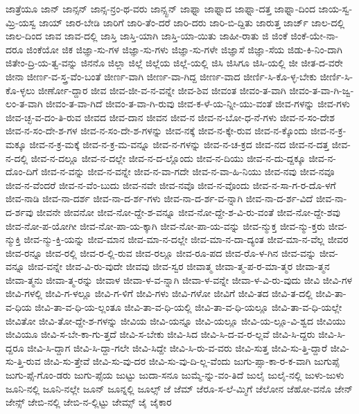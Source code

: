 {ಜಾತ್ರೆಯೂ
ಜಾನ್
ಜಾನ್ಸನ್
ಜಾನ್ಸ-ನ್ರಂ-ಥ-ವರು
ಜಾನ್ಸ್ಟನ್
ಜಾಫ್ನಾ
ಜಾಫ್ನಾದ
ಜಾಫ್ನಾ-ದತ್ತ
ಜಾಫ್ನಾ-ದಿಂದ
ಜಾಯ-ಸ್ವ-ಮ್ರಿ-ಯಸ್ವ
ಜಾಯ್
ಜಾರ-ಬೇಡಿ
ಜಾರಿಗೆ
ಜಾರಿ-ತೆಂ-ದರೆ
ಜಾರಿ-ದರು
ಜಾರಿ-ಬಿ-ದ್ದಿತು
ಜಾರುತ್ತ
ಜಾರ್ಜ್
ಜಾಲ-ದಲ್ಲಿ
ಜಾಲ-ದಿಂದ
ಜಾವ
ಜಾವ-ದಲ್ಲಿ
ಜಾಸ್ತಿ
ಜಾಸ್ತಿ-ಯಾಗಿ
ಜಾಸ್ತಿ-ಯಾ-ಯಿತು
ಜಾಹೀ-ರಾತು
ಜಿ
ಜಿಂಕೆ
ಜಿಂಕೆ-ಯೇ-ನಾ-ದರೂ
ಜಿಂಕೆಯೋ
ಜಿಕ
ಜಿಜ್ಞಾ-ಸು-ಗಳ
ಜಿಜ್ಞಾ-ಸು-ಗಳು
ಜಿಜ್ಞಾ-ಸು-ಗಳೇ
ಜಿಜ್ಞಾಸೆ
ಜಿಜ್ಞಾ-ಸೆಯ
ಜಿಡು-ಕಿ-ನಿಂ-ದಾಗಿ
ಜಿತೇಂ-ದ್ರಿ-ಯ-ತ್ವ-ವನ್ನು
ಜಿನನೊ
ಜಿಲ್ಲಾ
ಜಿಲ್ಲೆ
ಜಿಲ್ಲೆಯ
ಜಿಲ್ಲೆ-ಯಲ್ಲಿ
ಜಿಸಿ
ಜಿಸಿಗೂ
ಜಿಸಿ-ಯಲ್ಲಿ
ಜೀ
ಜೀತ-ದ-ವರೇ
ಜೀನಾ
ಜೀರ್ಣ-ವ-ಸ್ತ್ರ-ವೆಂ-ಬಂತೆ
ಜೀರ್ಣ-ವಾಗಿ
ಜೀರ್ಣ-ವಾ-ಗಿದ್ದ
ಜೀರ್ಣ-ವಾದ
ಜೀರ್ಣಿ-ಸಿ-ಕೊ-ಳ್ಳ-ಬೇಕು
ಜೀರ್ಣಿ-ಸಿ-ಕೊ-ಳ್ಳಲು
ಜೀರ್ಣೋ-ದ್ದಾರ
ಜೀವ
ಜೀವ-ಜೀ-ವ-ನ-ವನ್ನೇ
ಜೀವ-ಶಿವ
ಜೀವಂತ
ಜೀವಂ-ತ-ವಾಗಿ
ಜೀವಂ-ತ-ವಾ-ಗಿ-ಜ್ವ-ಲಂ-ತ-ವಾಗಿ
ಜೀವಂ-ತ-ವಾ-ಗಿದೆ
ಜೀವಂ-ತ-ವಾ-ಗಿ-ರುವು
ಜೀವ-ಕ-ಳೆ-ಯ-ನ್ನೀ-ಯು-ವಂತೆ
ಜೀವ-ಗಳನ್ನು
ಜೀವ-ಗಳು
ಜೀವ-ಚ್ಛ-ವ-ದಂ-ತಿ-ರುವ
ಜೀವದ
ಜೀವ-ದಾನ
ಜೀವನ
ಜೀವ-ನ
ಜೀವ-ನ-ಬೋ-ಧ-ನೆ-ಗಳು
ಜೀವ-ನ-ಸಂ-ದೇಶ
ಜೀವ-ನ-ಸಂ-ದೇ-ಶ-ಗಳ
ಜೀವ-ನ-ಸಂ-ದೇ-ಶ-ಗಳನ್ನು
ಜೀವ-ನಕ್ಕೆ
ಜೀವ-ನ-ಕ್ಕೇ-ರುವ
ಜೀವ-ನ-ಕ್ಕೊಂದು
ಜೀವ-ನ-ಕ್ರ-ಮಕ್ಕೂ
ಜೀವ-ನ-ಕ್ರ-ಮಕ್ಕೆ
ಜೀವ-ನ-ಕ್ರ-ಮ-ವನ್ನೂ
ಜೀವ-ನ-ಗಳನ್ನು
ಜೀವ-ನ-ಚ-ಕ್ರದ
ಜೀವ-ನದ
ಜೀವ-ನ-ದತ್ತ
ಜೀವ-ನ-ದಲ್ಲಿ
ಜೀವ-ನ-ದಲ್ಲೂ
ಜೀವ-ನ-ದಲ್ಲೇ
ಜೀವ-ನ-ದ-ಲ್ಲೊಂದು
ಜೀವ-ನ-ದಿಯು
ಜೀವ-ನ-ದು-ದ್ದಕ್ಕೂ
ಜೀವ-ನ-ದೊಂ-ದಿಗೆ
ಜೀವ-ನ-ವನ್ನು
ಜೀವ-ನ-ವನ್ನೇ
ಜೀವ-ನ-ವಾ-ಗದೇ
ಜೀವ-ನ-ವಾ-ಹಿ-ನಿಯು
ಜೀವ-ನವು
ಜೀವ-ನವೂ
ಜೀವ-ನ-ವೆಂದರೆ
ಜೀವ-ನ-ವೆಂ-ಬುದು
ಜೀವ-ನವೇ
ಜೀವ-ನವೊ
ಜೀವ-ನ-ವೊಂದು
ಜೀವ-ನ-ಸಾ-ಗ-ರ-ದೊ-ಳಗೆ
ಜೀವ-ನಾಡಿ
ಜೀವ-ನಾ-ದರ್ಶ
ಜೀವ-ನಾ-ದ-ರ್ಶ-ಗಳು
ಜೀವ-ನಾ-ದ-ರ್ಶ-ವ-ನ್ನಾಗಿ
ಜೀವ-ನಾ-ದ-ರ್ಶ-ವಿದೆ
ಜೀವ-ನಾ-ದ-ರ್ಶವು
ಜೀವನೇ
ಜೀವನೋ
ಜೀವ-ನೋ-ದ್ದೇ-ಶ-ವನ್ನೂ
ಜೀವ-ನೋ-ದ್ದೇ-ಶ-ವಿ-ರು-ವಂತೆ
ಜೀವ-ನೋ-ದ್ದೇ-ಶವು
ಜೀವ-ನೋ-ಪ-ಯೋಗೀ
ಜೀವ-ನೋ-ಪಾ-ಯ-ಕ್ಕಾಗಿ
ಜೀವ-ನೋ-ಪಾ-ಯ-ವನ್ನು
ಜೀವ-ನ್ಮುಕ್ತ
ಜೀವ-ನ್ಮು-ಕ್ತರು
ಜೀವ-ನ್ಮುಕ್ತಿ
ಜೀವ-ನ್ಮು-ಕ್ತಿ-ಯನ್ನು
ಜೀವ-ಮಾನ
ಜೀವ-ಮಾ-ನ-ದಲ್ಲೇ
ಜೀವ-ಮಾ-ನ-ದಾ-ದ್ಯಂತ
ಜೀವ-ಮಾ-ನ-ವೆಲ್ಲ
ಜೀವರ
ಜೀವ-ರನ್ನೂ
ಜೀವ-ರಲ್ಲಿ
ಜೀವ-ರ-ಲ್ಲಿ-ರುವ
ಜೀವ-ರಲ್ಲೂ
ಜೀವ-ರೂ-ಪದ
ಜೀವ-ರೊ-ಳ-ಗಿನ
ಜೀವ-ವನ್ನು
ಜೀವ-ವನ್ನೂ
ಜೀವ-ವನ್ನೇ
ಜೀವ-ವಿ-ರು-ವುದೇ
ಜೀವವು
ಜೀವ-ಸ್ವರ
ಜೀವಾತ್ಮ
ಜೀವಾ-ತ್ಮ-ಪ-ರ-ಮಾ-ತ್ಮರ
ಜೀವಾ-ತ್ಮನ
ಜೀವಾ-ತ್ಮನು
ಜೀವಾ-ತ್ಮ-ರನ್ನು
ಜೀವಾಳ
ಜೀವಾ-ಳ-ವ-ನ್ನಾಗಿ
ಜೀವಾ-ಳ-ವನ್ನೇ
ಜೀವಾ-ಳ-ವಿ-ರು-ವುದು
ಜೀವಿ
ಜೀವಿ-ಗಳ
ಜೀವಿ-ಗಳಲ್ಲಿ
ಜೀವಿ-ಗ-ಳಲ್ಲೂ
ಜೀವಿ-ಗ-ಳಿಗೆ
ಜೀವಿ-ಗಳು
ಜೀವಿ-ಗಳೋ
ಜೀವಿಗೆ
ಜೀವಿ-ತದ
ಜೀವಿ-ತ-ದಲ್ಲಿ
ಜೀವಿ-ತಾ-ವ-ಧಿಯ
ಜೀವಿ-ತಾ-ವ-ಧಿ-ಯ-ಲ್ಲಂತೂ
ಜೀವಿ-ತಾ-ವ-ಧಿ-ಯಲ್ಲಿ
ಜೀವಿ-ತಾ-ವ-ಧಿ-ಯಲ್ಲೂ
ಜೀವಿ-ತಾ-ವ-ಧಿ-ಯಲ್ಲೇ
ಜೀವಿತೋ
ಜೀವಿ-ತೋ-ದ್ದೇ-ಶ-ಗಳನ್ನು
ಜೀವಿಯ
ಜೀವಿ-ಯನ್ನೂ
ಜೀವಿ-ಯಲ್ಲೂ
ಜೀವಿ-ಯ-ಲ್ಲೂ-ವಿ-ಶ್ವದ
ಜೀವಿಯು
ಜೀವಿಯೂ
ಜೀವಿ-ಸ-ಬೇ-ಕಾ-ಗು-ತ್ತದೆ
ಜೀವಿ-ಸ-ಬೇಕು
ಜೀವಿ-ಸಿದ
ಜೀವಿ-ಸಿ-ದ-ವ-ರ-ಲ್ಲವೆ
ಜೀವಿ-ಸಿ-ದ್ದರು
ಜೀವಿ-ಸಿ-ದ್ದರೂ
ಜೀವಿ-ಸಿ-ದ್ದಾಗ
ಜೀವಿ-ಸಿ-ದ್ದಾ-ಗಲೇ
ಜೀವಿ-ಸಿದ್ದೇ
ಜೀವಿ-ಸಿ-ರು-ವ-ವರು
ಜೀವಿ-ಸುತ್ತ
ಜೀವಿ-ಸು-ತ್ತಿ-ದ್ದಾರೆ
ಜೀವಿ-ಸು-ತ್ತಿ-ರುವ
ಜೀವಿ-ಸು-ತ್ತೇವೆ
ಜೀವಿ-ಸು-ವು-ದರ
ಜೀವಿ-ಸು-ವು-ದಿ-ಲ್ಲ-ವೆಂದು
ಜುಗು-ಪ್ಸಾ-ಕಾ-ರ-ಕ-ವಾಗಿ
ಜುಗುಪ್ಸೆ
ಜುಗು-ಪ್ಸೆ-ಗೊಂ-ಡರು
ಜುಗು-ಪ್ಸೆಯ
ಜುಟ್ಟು
ಜುದಾ-ಸನೂ
ಜುಮ್ಮೆ-ನ್ನು-ವಂ-ತಿದೆ
ಜುಲೈ
ಜುಲೈ-ನಲ್ಲಿ
ಜುಳು-ಜುಳು
ಜೂನಿ-ನಲ್ಲಿ
ಜೂನಿ-ನಲ್ಲೇ
ಜೂನ್
ಜೂನ್ನಲ್ಲಿ
ಜೂಲ್ಸ್
ಜೆ
ಜೆಮ್
ಜೆರೂ-ಸ-ಲೆ-ಮ್ಮಿಗೆ
ಜೆಲೋನ
ಜೆಹೋ-ವನೊ
ಜೇನ್
ಜೇನ್ಸ್
ಜೇಬಿ-ನಲ್ಲಿ
ಜೇಬಿ-ನ-ಲ್ಲಿಟ್ಟು
ಜೇಮ್ಸ್
ಜೈ
ಜೈಕಾರ
}
